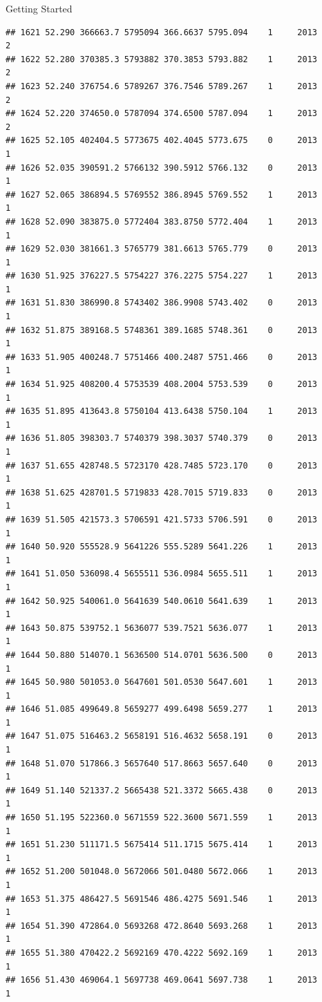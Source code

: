 \documentclass[
  ignorenonframetext,
]{beamer}
\begin{document}
\begin{frame}[fragile]{Getting Started}
\begin{verbatim}
## 1621 52.290 366663.7 5795094 366.6637 5795.094    1     2013        2
## 1622 52.280 370385.3 5793882 370.3853 5793.882    1     2013        2
## 1623 52.240 376754.6 5789267 376.7546 5789.267    1     2013        2
## 1624 52.220 374650.0 5787094 374.6500 5787.094    1     2013        2
## 1625 52.105 402404.5 5773675 402.4045 5773.675    0     2013        1
## 1626 52.035 390591.2 5766132 390.5912 5766.132    0     2013        1
## 1627 52.065 386894.5 5769552 386.8945 5769.552    1     2013        1
## 1628 52.090 383875.0 5772404 383.8750 5772.404    1     2013        1
## 1629 52.030 381661.3 5765779 381.6613 5765.779    0     2013        1
## 1630 51.925 376227.5 5754227 376.2275 5754.227    1     2013        1
## 1631 51.830 386990.8 5743402 386.9908 5743.402    0     2013        1
## 1632 51.875 389168.5 5748361 389.1685 5748.361    0     2013        1
## 1633 51.905 400248.7 5751466 400.2487 5751.466    0     2013        1
## 1634 51.925 408200.4 5753539 408.2004 5753.539    0     2013        1
## 1635 51.895 413643.8 5750104 413.6438 5750.104    1     2013        1
## 1636 51.805 398303.7 5740379 398.3037 5740.379    0     2013        1
## 1637 51.655 428748.5 5723170 428.7485 5723.170    0     2013        1
## 1638 51.625 428701.5 5719833 428.7015 5719.833    0     2013        1
## 1639 51.505 421573.3 5706591 421.5733 5706.591    0     2013        1
## 1640 50.920 555528.9 5641226 555.5289 5641.226    1     2013        1
## 1641 51.050 536098.4 5655511 536.0984 5655.511    1     2013        1
## 1642 50.925 540061.0 5641639 540.0610 5641.639    1     2013        1
## 1643 50.875 539752.1 5636077 539.7521 5636.077    1     2013        1
## 1644 50.880 514070.1 5636500 514.0701 5636.500    0     2013        1
## 1645 50.980 501053.0 5647601 501.0530 5647.601    1     2013        1
## 1646 51.085 499649.8 5659277 499.6498 5659.277    1     2013        1
## 1647 51.075 516463.2 5658191 516.4632 5658.191    0     2013        1
## 1648 51.070 517866.3 5657640 517.8663 5657.640    0     2013        1
## 1649 51.140 521337.2 5665438 521.3372 5665.438    0     2013        1
## 1650 51.195 522360.0 5671559 522.3600 5671.559    1     2013        1
## 1651 51.230 511171.5 5675414 511.1715 5675.414    1     2013        1
## 1652 51.200 501048.0 5672066 501.0480 5672.066    1     2013        1
## 1653 51.375 486427.5 5691546 486.4275 5691.546    1     2013        1
## 1654 51.390 472864.0 5693268 472.8640 5693.268    1     2013        1
## 1655 51.380 470422.2 5692169 470.4222 5692.169    1     2013        1
## 1656 51.430 469064.1 5697738 469.0641 5697.738    1     2013        1

\end{verbatim}
\end{frame}
\end{document}
